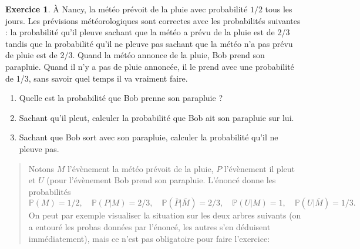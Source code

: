 \documentclass[10pt]{article}
\renewcommand{\P}{\mathbb P}
\theoremstyle{definition}
\newtheorem{exo}{Exercice}
\newenvironment{solution}{\begin{quote}\color{teal}}{\end{quote}}
\begin{document}
\begin{exo}%
     \`A Nancy, la météo prévoit de la pluie avec probabilité $1/2$ tous les jours.
     Les pr\'evisions m\'et\'eorologiques sont correctes avec les probabilités suivantes : la probabilit\'e qu'il pleuve sachant que la m\'et\'eo a pr\'evu de la pluie est de 2/3 tandis que la probabilit\'e qu'il ne pleuve pas sachant que la m\'et\'eo n'a pas pr\'evu de pluie est de 2/3.
     Quand la météo annonce de la pluie, Bob prend son parapluie.
     Quand il n'y a pas de pluie annonc\'ee, il le prend avec une probabilit\'e de 1/3, sans savoir quel temps il va vraiment faire.
     \begin{enumerate}
     	\item Quelle est la probabilité que Bob prenne son parapluie ? %
           \item Sachant qu'il pleut, calculer la probabilité que Bob ait son parapluie sur lui. %
           \item Sachant que Bob sort avec son parapluie, calculer la probabilité qu'il ne pleuve pas.%
     \end{enumerate}
     
     \begin{solution}
     Notons $M$ l'évènement \og la météo prévoit de la pluie\fg, $P$ l'évènement \og il pleut\fg{} et $U$ (pour l'évènement \og Bob prend son parapluie\fg.
     L'énoncé donne les probabilités 
     \[ \P(M)=1/2, \quad \P(P|M) = 2/3, \quad \P(\bar P | \bar M) = 2/3, \quad \P(U|M) = 1,\quad \P(U|\bar M) = 1/3.\]
     On peut par exemple visualiser la situation sur les deux arbres suivants (on a entouré les probas données par l'énoncé, les autres s'en déduisent immédiatement), mais ce n'est pas obligatoire pour faire l'exercice:
     \begin{center}
     \hspace{2cm}
\end{center}
\end{solution}
\end{exo}
\end{document}
